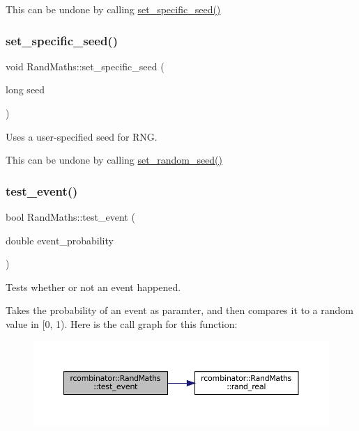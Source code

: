 This can be undone by calling {\ttfamily \mbox{\hyperlink{classrcombinator_1_1RandMaths_a76c7dc43d0faee17d4b328bd342934e0}{set\+\_\+specific\+\_\+seed()}}} \mbox{\label{classrcombinator_1_1RandMaths_a76c7dc43d0faee17d4b328bd342934e0}} 
\subsubsection{\texorpdfstring{set\+\_\+specific\+\_\+seed()}{set\_specific\_seed()}}
{\footnotesize\ttfamily void Rand\+Maths\+::set\+\_\+specific\+\_\+seed (\begin{DoxyParamCaption}\item[{long}]{seed }\end{DoxyParamCaption})}



Uses a user-\/specified seed for R\+NG. 

This can be undone by calling {\ttfamily \mbox{\hyperlink{classrcombinator_1_1RandMaths_a2b61e31de6067ffa35531d5bde40f4c6}{set\+\_\+random\+\_\+seed()}}} \mbox{\label{classrcombinator_1_1RandMaths_a183686140a9da18ad40c7e048ee8914e}} 
\subsubsection{\texorpdfstring{test\+\_\+event()}{test\_event()}}
{\footnotesize\ttfamily bool Rand\+Maths\+::test\+\_\+event (\begin{DoxyParamCaption}\item[{double}]{event\+\_\+probability }\end{DoxyParamCaption})}



Tests whether or not an event happened. 

Takes the probability of an event as paramter, and then compares it to a random value in \mbox{[}0, 1). Here is the call graph for this function\+:
\nopagebreak
\begin{figure}[H]
\begin{center}
\leavevmode
\includegraphics[width=350pt]{classrcombinator_1_1RandMaths_a183686140a9da18ad40c7e048ee8914e_cgraph}
\end{center}
\end{figure}


